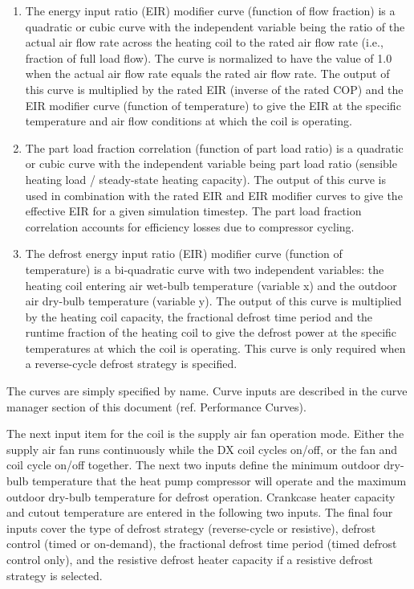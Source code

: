 \begin{enumerate}
\item
  The energy input ratio (EIR) modifier curve (function of flow fraction) is a quadratic or cubic curve with the independent variable being the ratio of the actual air flow rate across the heating coil to the rated air flow rate (i.e., fraction of full load flow). The curve is normalized to have the value of 1.0 when the actual air flow rate equals the rated air flow rate. The output of this curve is multiplied by the rated EIR (inverse of the rated COP) and the EIR modifier curve (function of temperature) to give the EIR at the specific temperature and air flow conditions at which the coil is operating.
\item
  The part load fraction correlation (function of part load ratio) is a quadratic or cubic curve with the independent variable being part load ratio (sensible heating load / steady-state heating capacity). The output of this curve is used in combination with the rated EIR and EIR modifier curves to give the effective EIR for a given simulation timestep. The part load fraction correlation accounts for efficiency losses due to compressor cycling.
\item
  The defrost energy input ratio (EIR) modifier curve (function of temperature) is a bi-quadratic curve with two independent variables: the heating coil entering air wet-bulb temperature (variable x) and the outdoor air dry-bulb temperature (variable y). The output of this curve is multiplied by the heating coil capacity, the fractional defrost time period and the runtime fraction of the heating coil to give the defrost power at the specific temperatures at which the coil is operating. This curve is only required when a reverse-cycle defrost strategy is specified.
\end{enumerate}

The curves are simply specified by name. Curve inputs are described in the curve manager section of this document (ref. Performance Curves).

The next input item for the coil is the supply air fan operation mode. Either the supply air fan runs continuously while the DX coil cycles on/off, or the fan and coil cycle on/off together. The next two inputs define the minimum outdoor dry-bulb temperature that the heat pump compressor will operate and the maximum outdoor dry-bulb temperature for defrost operation. Crankcase heater capacity and cutout temperature are entered in the following two inputs. The final four inputs cover the type of defrost strategy (reverse-cycle or resistive), defrost control (timed or on-demand), the fractional defrost time period (timed defrost control only), and the resistive defrost heater capacity if a resistive defrost strategy is selected.

